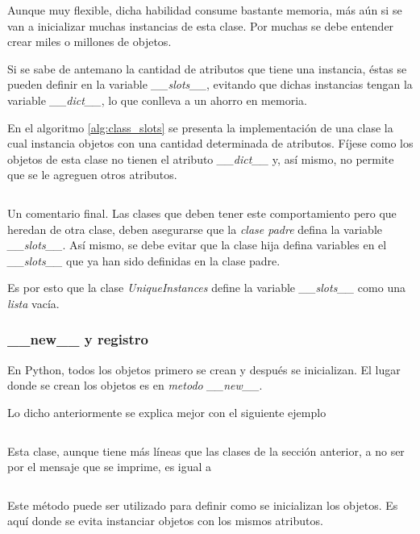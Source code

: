 \documentclass{article}
\newenvironment{code}{\captionsetup{type=listing}}{}
\begin{document}
	Aunque muy flexible, dicha habilidad consume bastante memoria, más aún si se van a inicializar muchas instancias de esta clase. Por muchas se debe entender crear miles o millones de objetos.

	Si se sabe de antemano la cantidad de atributos que tiene una instancia, éstas se pueden definir en la variable \emph{\_\_slots\_\_}, evitando que dichas instancias tengan la variable \emph{\_\_dict\_\_}, lo que conlleva a un ahorro en memoria.

	En el algoritmo \ref{alg:class_slots} se presenta la implementación de una clase la cual instancia objetos con una cantidad determinada de atributos. Fíjese como los objetos de esta clase no tienen el atributo \emph{\_\_dict\_\_} y, así mismo, no permite que se le agreguen otros atributos.
	\begin{code}
		\inputminted[firstline=9, lastline=23]{python}{dumpy.py}
		\label{alg:class_slots}
	\end{code}

	Un comentario final. Las clases que deben tener este comportamiento pero que heredan de otra clase, deben asegurarse que la \emph{clase padre} defina la variable \emph{\_\_slots\_\_}. Así mismo, se debe evitar que la clase hija defina variables en el \emph{\_\_slots\_\_} que ya han sido definidas en la clase padre\cite{lutz2013learning}.

	Es por esto que la clase \emph{UniqueInstances} define la variable \emph{\_\_slots\_\_} como una \emph{lista} vacía.

	\subsubsection{\_\_new\_\_ y registro}

	En Python, todos los objetos primero se crean y después se inicializan. El lugar donde se crean los objetos es en \emph{metodo} \emph{\_\_new\_\_}.

	Lo dicho anteriormente se explica mejor con el siguiente ejemplo
	\inputminted[firstline=25, lastline=30]{python}{dumpy.py}

	Esta clase, aunque tiene más líneas que las clases de la sección anterior, a no ser por el mensaje que se imprime, es igual a
	\inputminted[firstline=1, lastline=2]{python}{dumpy.py}

	Este método puede ser utilizado para definir como se inicializan los objetos. Es aquí donde se evita instanciar objetos con los mismos atributos.
\end{document}
